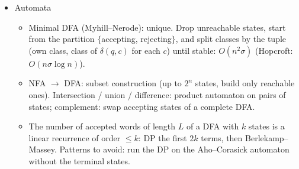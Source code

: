 \begin{itemize}
\item Automata
\begin{itemize}
  \item Minimal DFA (Myhill–Nerode): unique. Drop unreachable states, start from the partition $\{$accepting, rejecting$\}$, and split classes by the tuple (own class, class of $\delta(q, c)$ for each $c$) until stable: $O(n^2 \sigma)$ (Hopcroft: $O(n \sigma \log n)$).
  \item NFA $\to$ DFA: subset construction (up to $2^n$ states, build only reachable ones). Intersection / union / difference: product automaton on pairs of states; complement: swap accepting states of a complete DFA.
  \item The number of accepted words of length $L$ of a DFA with $k$ states is a linear recurrence of order $\le k$: DP the first $2k$ terms, then Berlekamp–Massey. Patterns to avoid: run the DP on the Aho–Corasick automaton without the terminal states.
\end{itemize}
\end{itemize}
